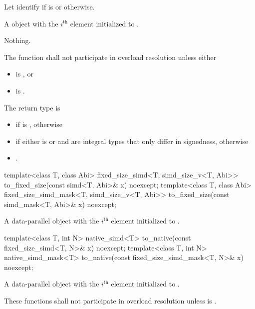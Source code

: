 \begin{itemdescr}
  \pnum
  Let  identify  if  is  or  otherwise.

  \pnum\returns
  A  object with the $i^\text{th}$ element initialized to  \foralli.

  \pnum\throws Nothing.

  \pnum\remarks
  The function shall not participate in overload resolution unless either
  \begin{itemize}
    \item {} is , or
    \item {} is .
  \end{itemize}

  \pnum
  The return type is
  \begin{itemize}
    \item {} if  is , otherwise
    \item {} if either  is  or  and  are integral types that only differ in signedness, otherwise
    \item {}.
  \end{itemize}
\end{itemdescr}

\begin{itemdecl}
template<class T, class Abi>
  fixed_size_simd<T, simd_size_v<T, Abi>> to_fixed_size(const simd<T, Abi>& x) noexcept;
template<class T, class Abi>
  fixed_size_simd_mask<T, simd_size_v<T, Abi>> to_fixed_size(const simd_mask<T, Abi>& x) noexcept;
\end{itemdecl}

\begin{itemdescr}
  \pnum\returns
  A data-parallel object with the $i^\text{th}$ element initialized to  \foralli.
\end{itemdescr}

\begin{itemdecl}
template<class T, int N> native_simd<T> to_native(const fixed_size_simd<T, N>& x) noexcept;
template<class T, int N> native_simd_mask<T> to_native(const fixed_size_simd_mask<T, N>& x) noexcept;
\end{itemdecl}

\begin{itemdescr}
  \pnum\returns
  A data-parallel object with the $i^\text{th}$ element initialized to  \foralli.

  \pnum\remarks
  These functions shall not participate in overload resolution unless  is .
\end{itemdescr}

